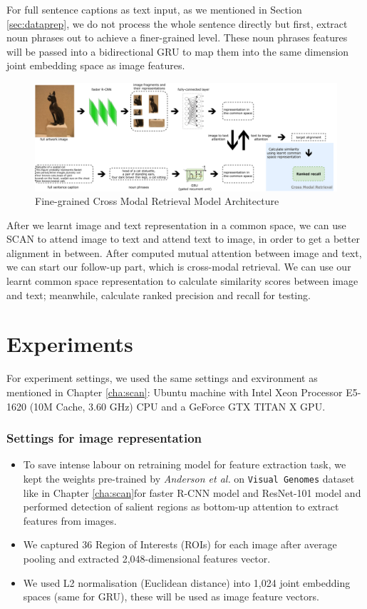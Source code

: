 For full sentence captions as text input, as we mentioned in Section \ref{sec:dataprep}, we do not process the whole sentence directly but first, extract noun phrases out to achieve a finer-grained level. These noun phrases features will be passed into a bidirectional GRU to map them into the same dimension joint embedding space as image features. 

\begin{figure}[h!]
\centering
\includegraphics[width=1.0\textwidth]{archi.pdf}
\caption{Fine-grained Cross Modal Retrieval Model Architecture}
\label{fig:mainarch}
\end{figure}

After we learnt image and text representation in a common space, we can use SCAN to attend image to text and attend text to image, in order to get a better alignment in between. After computed mutual attention between image and text, we can start our follow-up part, which is cross-modal retrieval. We can use our learnt common space representation to calculate similarity scores between image and text; meanwhile, calculate ranked precision and recall for testing.

\section{Experiments}

For experiment settings, we used the same settings and exvironment as mentioned in Chapter \ref{cha:scan}: Ubuntu machine with Intel Xeon Processor E5-1620 (10M Cache, 3.60 GHz) CPU and a GeForce GTX TITAN X GPU. 

\subsubsection{Settings for image representation}

\begin{itemize}
    \item To save intense labour on retraining model for feature extraction task, we kept the weights pre-trained by \textit{Anderson et al.} on \verb|Visual Genomes| dataset like in Chapter \ref{cha:scan}for faster R-CNN model and ResNet-101 model and performed detection of salient regions as bottom-up attention to extract features from images. 
    \item We captured 36 Region of Interests (ROIs) for each image after average pooling and extracted 2,048-dimensional features vector.
    \item We used L2 normalisation (Euclidean distance) into 1,024 joint embedding spaces (same for GRU), these will be used as image feature vectors.
\end{itemize}

